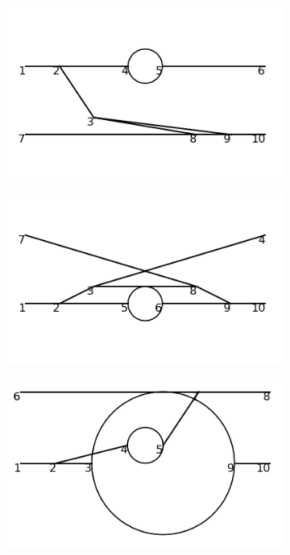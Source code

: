 \documentclass[11pt,a4paper,twoside,pdf]{article}
\numberwithin{equation}{section}
\begin{document}
\begin{figure}[h!]
\begin{subfigure}[t]{0.16\textwidth}
    \end{subfigure}
    \begin{subfigure}[t]{0.16\textwidth}
        \centering
        \includegraphics[width=\textwidth]{plots/order6_2to2/48.png}
    \end{subfigure}
    \hfill
    \begin{subfigure}[t]{0.16\textwidth}
        \centering
        \includegraphics[width=\textwidth]{plots/order6_2to2/49.png}
    \end{subfigure}
    \hfill
    \begin{subfigure}[t]{0.16\textwidth}
        \centering
        \includegraphics[width=\textwidth]{plots/order6_2to2/50.png}

\end{subfigure}
\end{figure}
\end{document}
